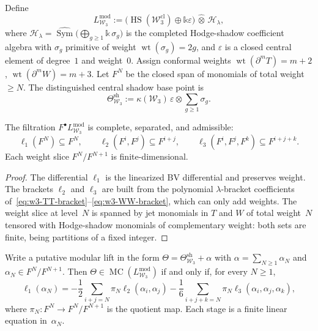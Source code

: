 \begin{definition}
\label{def:w-weighted-modular-envelope}
Define
\[
L_{\mathcal{W}_3}^{\mathrm{mod}}
:=
\bigl(\operatorname{HS}(\mathcal{W}_3^{\mathrm{cl}})
\oplus \mathbb{k}\varepsilon\bigr)
\,\widehat{\otimes}\,\mathcal{H}_\lambda,
\]
where $\mathcal{H}_\lambda = \widehat{\operatorname{Sym}}
\bigl(\bigoplus_{g \ge 1}\mathbb{k}\,\sigma_g\bigr)$ is the
completed Hodge-shadow coefficient algebra with $\sigma_g$ primitive
of weight $\operatorname{wt}(\sigma_g) = 2g$, and $\varepsilon$ is a
closed central element of degree~$1$ and weight~$0$.  Assign conformal
weights $\operatorname{wt}(\partial^m T) = m+2$,
$\operatorname{wt}(\partial^m W) = m+3$.  Let $F^N$ be the closed span
of monomials of total weight $\ge N$.  The distinguished central
shadow base point is
\[
\Theta_{\mathcal{W}_3}^{\mathrm{sh}}
:= \kappa(\mathcal{W}_3)\,\varepsilon \otimes \sum_{g \ge 1}\sigma_g.
\]
\end{definition}

\begin{proposition}
\label{prop:w-semistrict-admissibility}
The filtration $F^\bullet L_{\mathcal{W}_3}^{\mathrm{mod}}$ is
complete, separated, and admissible:
\[
\ell_1(F^N) \subseteq F^N,
\qquad
\ell_2(F^i, F^j) \subseteq F^{i+j},
\qquad
\ell_3(F^i, F^j, F^k) \subseteq F^{i+j+k}.
\]
Each weight slice $F^N/F^{N+1}$ is finite-dimensional.
\end{proposition}

\begin{proof}
The differential $\ell_1$ is the linearized BV differential and
preserves weight.  The brackets $\ell_2$ and $\ell_3$ are built from
the polynomial $\lambda$-bracket coefficients
of~\eqref{eq:w3-TT-bracket}--\eqref{eq:w3-WW-bracket}, which can
only add weights.  The weight slice at level~$N$ is spanned by
jet monomials in $T$ and $W$ of total weight~$N$ tensored with
Hodge-shadow monomials of complementary weight: both sets are finite,
being partitions of a fixed integer.
\end{proof}

\begin{theorem}
\label{thm:w-cubic-weight-recursion}
Write a putative modular lift in the form
$\Theta = \Theta_{\mathcal{W}_3}^{\mathrm{sh}} + \alpha$ with
$\alpha = \sum_{N \ge 1}\alpha_N$ and
$\alpha_N \in F^N/F^{N+1}$.  Then
$\Theta \in \operatorname{MC}(L_{\mathcal{W}_3}^{\mathrm{mod}})$ if
and only if, for every $N \ge 1$,
\begin{equation}
\label{eq:w-cubic-weight-recursion}
\ell_1(\alpha_N)
= -\frac{1}{2}\sum_{i+j=N}\pi_N\ell_2(\alpha_i,\alpha_j)
  -\frac{1}{6}\sum_{i+j+k=N}\pi_N\ell_3(\alpha_i,\alpha_j,\alpha_k),
\end{equation}
where $\pi_N \colon F^N \to F^N/F^{N+1}$ is the quotient map.  Each
stage is a finite linear equation in~$\alpha_N$.
\end{theorem}

